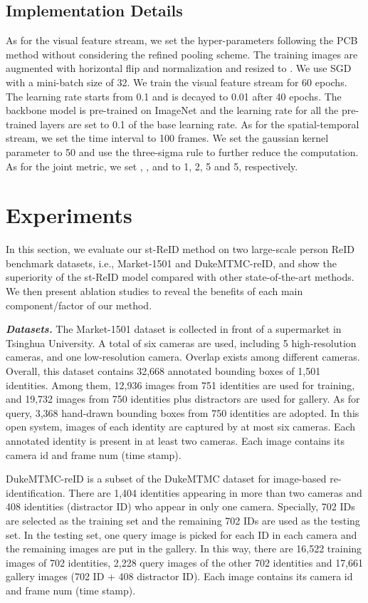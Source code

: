 \documentclass[letterpaper]{article} \usepackage{aaai19}  \usepackage{times}  \usepackage{helvet}  \usepackage{courier}  \usepackage{url}  \usepackage{graphicx}  \usepackage{subfig}
\begin{document}
\subsection{Implementation Details}
As for the visual feature stream, we set the hyper-parameters following the PCB method \cite{Yifan2017arxiv} without considering the refined pooling scheme. The training images are augmented with horizontal flip and normalization and resized to . We use SGD with a mini-batch size of 32. We train the visual feature stream for 60 epochs. The learning rate starts from 0.1 and is decayed to 0.01 after 40 epochs. The backbone model is pre-trained on ImageNet and the learning rate for all the pre-trained layers are set to 0.1  of the base learning rate. As for the spatial-temporal stream, we set the time interval  to 100 frames. We set the gaussian kernel parameter  to 50 and use the three-sigma rule to further reduce the computation. As for the joint metric, we set , ,  and  to 1, 2, 5 and 5, respectively.


\section{Experiments}
\label{sec:exp}
In this section, we evaluate our st-ReID method on two large-scale person ReID benchmark datasets, i.e., Market-1501 and DukeMTMC-reID, and show the superiority of the st-ReID model compared with other state-of-the-art methods. We then present ablation studies to reveal the benefits of each main component/factor of our method.

\textbf{\emph{Datasets.} }
The Market-1501 dataset is collected in front of a supermarket in Tsinghua University. A total of six cameras are used, including 5 high-resolution cameras, and one low-resolution camera. Overlap exists among different cameras. Overall, this dataset contains 32,668 annotated bounding boxes of 1,501 identities. Among them, 12,936 images from 751 identities are used for training, and 19,732 images from 750 identities plus distractors are used for gallery. As for query, 3,368 hand-drawn bounding boxes from 750 identities are adopted. In this open system, images of each identity are captured by at most six cameras. Each annotated identity is present in at least two cameras. Each image contains its camera id and frame num (time stamp).

DukeMTMC-reID is a subset of the DukeMTMC dataset for image-based re-identification. There are 1,404 identities appearing in more than two cameras and 408 identities (distractor ID) who appear in only one camera. Specially, 702 IDs are selected as the training set and the remaining 702 IDs are used as the testing set. In the testing set, one query image is picked for each ID in each camera and the remaining images are put in the gallery. In this way, there are 16,522 training images of 702 identities, 2,228 query images of the other 702 identities and 17,661 gallery images (702 ID + 408 distractor ID). Each image contains its camera id and frame num (time stamp).
\end{document}
